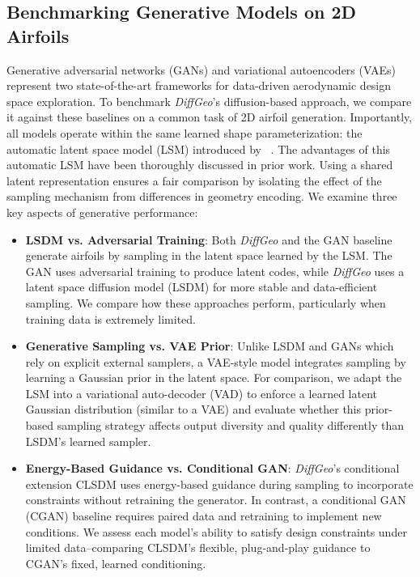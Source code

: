 \subsection{Benchmarking Generative Models on 2D Airfoils}
\label{ch6:sec:benchmarking}

Generative adversarial networks (GANs) and variational autoencoders (VAEs) represent two state-of-the-art frameworks for data-driven aerodynamic design space exploration. To benchmark \textit{DiffGeo}’s diffusion-based approach, we compare it against these baselines on a common task of 2D airfoil generation. Importantly, all models operate within the same learned shape parameterization: the automatic latent space model (LSM) introduced by ~\citet{aa.Wei2023,aa.Wei2023b}. The advantages of this automatic LSM have been thoroughly discussed in prior work. Using a shared latent representation ensures a fair comparison by isolating the effect of the sampling mechanism from differences in geometry encoding. We examine three key aspects of generative performance:

\begin{itemize}
    \item \textbf{LSDM vs. Adversarial Training}: Both \textit{DiffGeo} and the GAN baseline generate airfoils by sampling in the latent space learned by the LSM. The GAN uses adversarial training to produce latent codes, while \textit{DiffGeo} uses a latent space diffusion model (LSDM) for more stable and data-efficient sampling. We compare how these approaches perform, particularly when training data is extremely limited.

    \item \textbf{Generative Sampling vs. VAE Prior}: Unlike LSDM and GANs which rely on explicit external samplers, a VAE-style model integrates sampling by learning a Gaussian prior in the latent space. For comparison, we adapt the LSM into a variational auto-decoder (VAD) to enforce a learned latent Gaussian distribution (similar to a VAE) and evaluate whether this prior-based sampling strategy affects output diversity and quality differently than LSDM’s learned sampler.

    \item \textbf{Energy-Based Guidance vs. Conditional GAN}: \textit{DiffGeo}’s conditional extension CLSDM uses energy-based guidance during sampling to incorporate constraints without retraining the generator. In contrast, a conditional GAN (CGAN) baseline requires paired data and retraining to implement new conditions. We assess each model’s ability to satisfy design constraints under limited data--comparing CLSDM’s flexible, plug-and-play guidance to CGAN’s fixed, learned conditioning.
\end{itemize}


